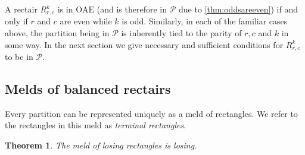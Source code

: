 \documentclass[pdflatex,sn-mathphys-num]{sn-jnl}%
\theoremstyle{thmstyleone}%
\newtheorem{theorem}{Theorem}%
\theoremstyle{thmstyletwo}%
\theoremstyle{thmstylethree}%
\newtheorem{definition}{Definition}%
\newcommand{\p}{\mathcal P}
\newcommand{\dps}{\mathrm{DPS}}
\newcommand{\ps}{\mathrm{PS}}
\newcommand{\s}{S}
\newcommand{\OAE}{\mathrm{OAE}}
\begin{document}



A rectair $R^k_{r, c}$ is in $\OAE$ (and is therefore in $\p$ due to \cref{thm:oddsareeven}) if and only if $r$ and $c$ are even while $k$ is odd. Similarly, in each of the familiar cases above, the partition being in $\p$ is inherently tied to the parity of $r,c$ and $k$ in some way. In the next section we give necessary and sufficient conditions for $R^k_{r, c}$ to be in $\p$. 

\subsection{Melds of balanced rectairs} \label{sec:melds}



Every partition can be represented uniquely as a meld of rectangles. We refer to the rectangles in this meld as \emph{terminal rectangles}. 

\begin{theorem} \label{thm:ltrl}
    The meld of losing rectangles is losing.
\end{theorem}
\end{document}

